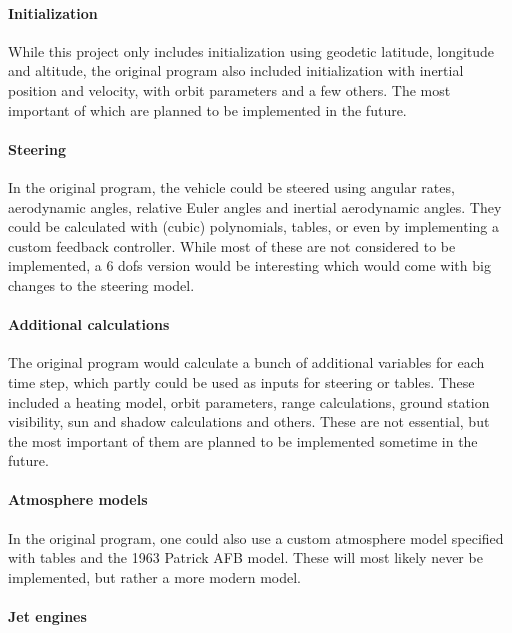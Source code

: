 \paragraph{Initialization}

While this project only includes initialization using geodetic latitude,
longitude and altitude, the original program also included initialization with
inertial position and velocity, with orbit parameters and a few others. The
most important of which are planned to be implemented in the future.

\paragraph{Steering}

In the original program, the vehicle could be steered using angular rates,
aerodynamic angles, relative Euler angles and inertial aerodynamic angles.
They could be calculated with (cubic) polynomials, tables, or even by
implementing a custom feedback controller. While most of these are not
considered to be implemented, a 6 \glspl{dof} version would be interesting which would come with big changes to
the steering model.

\paragraph{Additional calculations}

The original program would calculate a bunch of additional variables for each
time step, which partly could be used as inputs for steering or tables. These
included a heating model, orbit parameters, range calculations, ground station
visibility, sun and shadow calculations and others. These are not essential,
but the most important of them are planned to be implemented sometime in the
future.

\paragraph{Atmosphere models}

In the original program, one could also use a custom atmosphere model
specified with tables and the 1963 Patrick AFB model. These will most likely
never be implemented, but rather a more modern model.

\paragraph{Jet engines}

